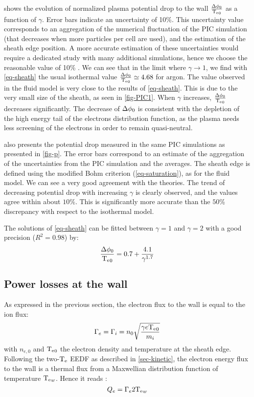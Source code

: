  shows the evolution of normalized plasma potential drop to the wall $\frac{\Delta \phi_0}{\mathrm{T_e}_0}$ as a function of $\gamma$.
{  Error bars indicate an uncertainty of 10\%.
This uncertainty value corresponds to an aggregation of the numerical fluctuation of the PIC simulation (that decreases when more particles per cell are used), and the estimation of the sheath edge position.
A more accurate estimation of these uncertainties would require a dedicated study with many additional simulations, hence we choose the reasonable value of 10\% \citep{turner2013}.}
We can see that in the limit where $\gamma \rightarrow 1$, we find with \cref{eq-sheath} the usual isothermal value $\frac{\Delta \phi_0}{\mathrm{T_e}_0}  \simeq 4.68$ for argon.
The value observed in the fluid model is very close to the results of \cref{eq-sheath}.
This is due to the very small size of the sheath, as seen in \cref{fig-PIC1}.
When $\gamma$ increases, $\frac{\Delta \phi_0}{\mathrm{T_e}_0}$ decreases significantly.
The decrease of $\Delta \phi_0$ is consistent with the depletion of the high energy tail of the electrons distribution function, as the plasma needs less screening of the electrons in order to remain quasi-neutral.

 also presents the potential drop measured in the same PIC simulations as presented in \cref{fig-p}.
The error bars correspond to an estimate of the aggregation of the uncertainties from the PIC simulation and the averages.
The sheath edge is defined using the modified Bohm criterion (\cref{eq-saturation}), as for the fluid model.
We can see a very good agreement with the theories.
The trend of decreasing potential drop with increasing $\gamma$ is clearly observed, and the values agree within about $10\%$.
This is significantly more accurate than the $50$\% discrepancy with respect to the isothermal model.

The solutions of \cref{eq-sheath} can be fitted between $\gamma = 1$ and $\gamma = 2$ with a good precision ($R^2 = 0.98$) by:
\begin{equation}
  \label{eq-fit}
  \frac{\Delta \phi_0}{\mathrm{T_e}_0} = 0.7 + \frac{4.1}{\gamma^{1.7}}
\end{equation}

\subsection{Power losses at the wall}

As expressed in the previous section, the electron flux to the wall is equal to the ion flux:
\begin{equation}
  \Gamma_e = \Gamma_i =  n_0 \sqrt{\frac{\gamma e \mathrm{T_e}_0}{m_i}}
\end{equation}
with $n_{e,0}$ and $\mathrm{T_e}_0$ the electron density and temperature at the sheath edge.
Following the two-$\mathrm{T_e}$ EEDF as described in \cref{sec-kinetic}, the electron energy flux to the wall is a thermal flux from a Maxwellian distribution function of temperature  $\mathrm{T_e}_w$.
Hence it reads \cite{chabert2011}:
\begin{equation}
  \label{eq-maxflux}
  Q_e = \Gamma_e 2 \mathrm{T_e}_{w}
\end{equation}


